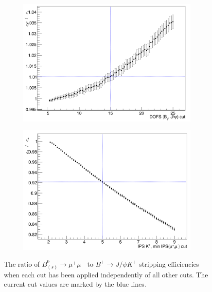 \begin{figure}
    \begin{subfigure}[b]{0.4\textwidth}
        \includegraphics[width=\textwidth]{./Figs/Selection/DOFS.png}
        \caption{ }
        \label{fig:FD_ratio}
    \end{subfigure}
   \begin{subfigure}[b]{0.4\textwidth}
        \includegraphics[width=\textwidth]{./Figs/Selection/daug_IPS.png}
        \caption{ }
        \label{fig:IPS_ratio}
    \end{subfigure}
    \caption{The ratio of $B^{0}_{(s)}\to\mu^{+} \mu^{-}$ to $B^{+}\to J/\psi K^{+}$ stripping efficiencies when each cut has been applied independently of all other cuts. The current cut values are marked by the blue lines.}
    \label{fig:ratioplotsJpsik}
\end{figure}


